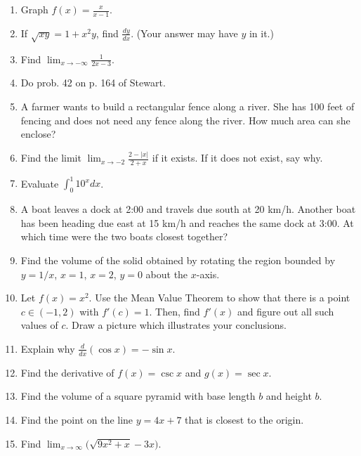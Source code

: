 \documentclass[12pt]{article}
\begin{document}
\begin{enumerate}[(1)]
\item
Graph $f(x) = \frac{x}{x - 1}$.

\item
If $\sqrt{xy} = 1 + x^2 y$, find $\frac{dy}{dx}$. (Your answer may have $y$ in it.)

\item
Find $\lim_{x \rightarrow - \infty} \frac{1}{2x - 3}$.

\item
Do prob. 42 on p. 164 of Stewart.

\item
A farmer wants to build a rectangular fence along a river. She has 100 feet of fencing and
does not need any fence along the river. How much area can she enclose?

\item
Find the limit $\lim_{x \rightarrow -2} \frac{2 - |x|}{2 + x}$ if it exists.
If it does not exist, say why.

\item
Evaluate $\int_0^1 10^x dx$.

\item
A boat leaves a dock at 2:00 and travels due south at 20 km/h. Another boat has been
heading due east at 15 km/h and reaches the same dock at 3:00. At which time were the two
boats closest together?

\item
Find the volume of the solid obtained by rotating the region bounded by
$y = 1/x$, $x = 1$, $x = 2$, $y = 0$ about the $x$-axis.

\item
Let $f(x) = x^2$. Use the Mean Value Theorem to show that there is a point $c \in (-1, 2)$
with $f'(c) = 1$. Then, find $f'(x)$ and figure out all such values of $c$. Draw
a picture which illustrates your conclusions.

\item
Explain why $\frac{d}{dx}(\cos x) = - \sin x$.

\item
Find the derivative of $f(x) = \csc x$ and $g(x) = \sec x$.

\item
Find the volume of a square pyramid with base length $b$ and height $b$.

\item
Find the point on the line $y = 4x + 7$ that is closest to the origin.

\item
Find $\lim_{x \rightarrow \infty} \big( \sqrt{9 x^2 + x} - 3x \big)$.


\end{enumerate}
\end{document}
